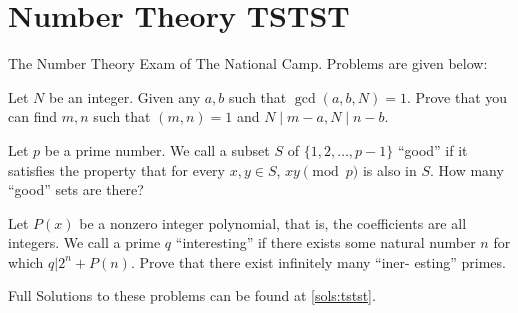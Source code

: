 

\chapter{Number Theory TSTST}\label{tstst:nt}

The Number Theory Exam of The National Camp.
Problems are given below:
\begin{prob}\label{nt:1}
Let $N$ be an integer. Given any $a, b$ such that $\gcd(a, b, N) = 1$. Prove
that you can find $m, n$ such that $(m, n) = 1$ and $N\mid m - a, N\mid n - b$.
\end{prob}

\begin{prob}\label{nt:2}
Let $p$ be a prime number. We call a subset $S$ of $\{1, 2, \ldots , p - 1\}$
“good” if it satisfies the property that for every $x, y \in S$, $xy \pmod p$ is also in $S$.
How many “good” sets are there?
\end{prob}

\begin{prob}\label{nt:3}
Let $P(x)$ be a nonzero integer polynomial, that is, the coefficients
are all integers. We call a prime $q$ “interesting” if there exists some natural
number $n$ for which $q|2^n + P(n)$. Prove that there exist infinitely many “iner-
esting” primes.
\end{prob}



Full Solutions to these problems can be found at \autoref{sols:tstst}.